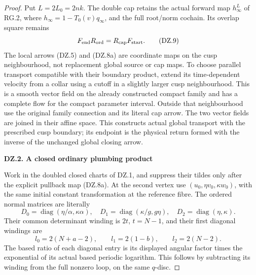 \begin{proof}
Put \(L=2L_0=2nk\). The double cap retains the actual forward map
\(h_\infty^L\) of RG.2,
where \(h_\infty=1-T_0(v)q_\infty\), and the full root/norm
cochain. Its overlap square remains
\[
                   F_{\rm end}R_{\rm ord}
                         =R_{\rm cap}F_{\rm start}.  \tag{DZ.9}
\]
The local arrows (DZ.5) and (DZ.8a) are coordinate maps on the cusp
neighbourhood, not replacement global source or cap maps. To choose
parallel transport compatible with their boundary product, extend
its time-dependent velocity from a collar using a cutoff in a
slightly larger cusp neighbourhood. This is a smooth vector field
on the already constructed compact family and has a complete flow
for the compact parameter interval. Outside that neighbourhood use
the original family connection and its literal cap arrow.
The two vector fields are joined in their affine space. This
constructs actual global transport with the prescribed cusp
boundary; its endpoint is the physical return formed with the
inverse of the unchanged global closing arrow.

\par

\medskip\noindent\textbf{DZ.2. A closed ordinary plumbing product}

\par\nobreak

Work in the doubled closed charts of DZ.1, and suppress their
tildes only after the explicit pullback map (DZ.8a). At the second vertex use
\((u_0,\eta v_0,\kappa w_0)\), with the same initial constant
transformation at the reference fibre. The ordered normal matrices
are literally
\[
 D_0=\operatorname{diag}(\eta/\alpha,\kappa\alpha),\quad
 D_1=\operatorname{diag}(\kappa/g,g\eta),\quad
 D_2=\operatorname{diag}(\eta,\kappa).                \tag{DZ.10}
\]
Their common determinant winding is \(2t\), \(t=N-1\), and their
first diagonal windings are
\[
 l_0=2(N+a-2),\qquad l_1=2(1-b),\qquad
 l_2=2(N-2).                                        \tag{DZ.11}
\]
The based ratio of each diagonal entry is its displayed angular
factor times the exponential of its actual based periodic
logarithm. This follows by subtracting its winding from the full
nonzero loop, on the same \(q\)-disc.


\end{proof}

